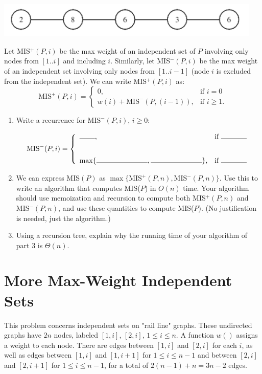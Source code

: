 \documentclass[11pt]{article}
\def\question#1{\red{#1}}
\def\red#1{{\color{red}#1}}
\begin{document}
\vspace{.1in}
\hspace{.75in}
\includegraphics[width=5in]{../figs/path-graph.png}

\vspace{.1in}

\noindent
Let MIS$^+(P,i)$ be the max weight of an independent
set of $P$ involving only nodes from $[1..i]$ and including $i$.  
Similarly, let MIS$^-(P,i)$ be the max weight of an independent set
involving only nodes from $[1..i-1]$ (node $i$ is excluded from the independent
set). We can write MIS$^+(P,i)$ as:
\[
\mbox{MIS}^+(P,i) = \left \{\begin{array}{ll}
                   0, & \mbox{if } i = 0 \\
                   w(i) +  \mbox{MIS}^-(P,(i-1)), & \mbox{if } i \ge 1.
                   \end{array} \right.
\]

\begin{enumerate}
\item \question{Write a recurrence for $\mbox{MIS}^-(P,i)$, $i\ge 0$:}

\[
   \mbox{MIS}^-(P,i) = \left \{\begin{array}{ll}
                   \rule{.3in}{0.4pt}, & \mbox{if } \rule{.5in}{0.4pt} \\[.3in]
                   \max \{  \rule{1in}{0.4pt}, \rule{1in}{0.4pt} \}, & \mbox{if } \rule{.5in}{0.4pt} \\
                   \end{array} \right.
   \]

\item 
We can express MIS$(P)$ as $\max \{\mbox{MIS}^+(P,n), \mbox{MIS}^-(P,n) \}$. 
\question{Use this to write an algorithm that computes MIS($P$) in $O(n)$ time.}  
Your algorithm should use memoization and recursion to compute both
MIS$^+(P,n)$ and MIS$^-(P,n)$, and use these quantities to compute
MIS($P$). (No justification is needed, just the algorithm.)

\item \question{Using a recursion tree, explain why the running time of your algorithm of part 3 is $\Theta(n)$.}
\end{enumerate}

\section{More Max-Weight Independent Sets}
\label{sec-5}
This problem concerns independent sets on "rail line" graphs. These
undirected graphs have $2n$ nodes, labeled $[1,i]$, $[2,i]$, $1 \le i
\le n$. A function $w()$ assigns a weight to each node. There are
edges between $[1,i]$ and $[2,i]$ for each $i$, as well as edges
between $[1,i]$ and $[1,i+1]$ for $1 \le i \le n-1$ and between
$[2,i]$ and $[2,i+1]$ for $1 \le i \le n-1$, for a total of $2(n-1) +
n = 3n-2$ edges.
\end{document}
